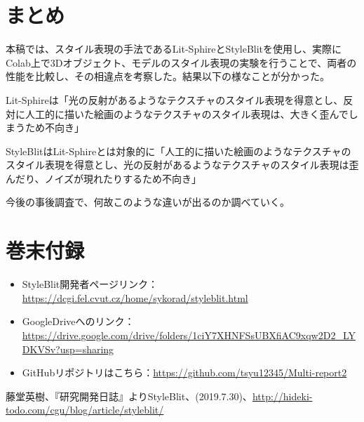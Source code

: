\documentclass[dvipdfmx]{jsarticle}
\begin{document}
\section{まとめ}
本稿では、スタイル表現の手法であるLit-SphireとStyleBlitを使用し、実際にColab上で3Dオブジェクト、モデルのスタイル表現の実験を行うことで、両者の性能を比較し、その相違点を考察した。結果以下の様なことが分かった。\par
Lit-Sphireは「光の反射があるようなテクスチャのスタイル表現を得意とし、反対に人工的に描いた絵画のようなテクスチャのスタイル表現は、大きく歪んでしまうため不向き」\par
StyleBlitはLit-Sphireとは対象的に「人工的に描いた絵画のようなテクスチャのスタイル表現を得意とし、光の反射があるようなテクスチャのスタイル表現は歪んだり、ノイズが現れたりするため不向き」\par
今後の事後調査で、何故このような違いが出るのか調べていく。
\section{巻末付録}
\begin{itemize}
  \item StyleBlit開発者ページリンク：\url{https://dcgi.fel.cvut.cz/home/sykorad/styleblit.html}
  \item GoogleDriveへのリンク：\url{https://drive.google.com/drive/folders/1ciY7XHNFSsUBXfiAC9xqw2D2_LYDKVSv?usp=sharing}
  \item GitHubリポジトリはこちら：\url{https://github.com/tsyu12345/Multi-report2}
\end{itemize}
\begin{thebibliography}{99}
   藤堂英樹、『研究開発日誌』よりStyleBlit、(2019.7.30)、\url{http://hideki-todo.com/cgu/blog/article/styleblit/}
\end{thebibliography}
\end{document}
